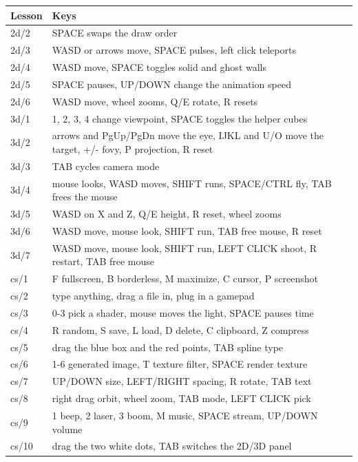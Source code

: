 \begin{center}
\begin{tabular}{@{}lp{9.6cm}@{}}
\toprule
\textbf{Lesson} & \textbf{Keys} \\
\midrule
2d/2 & SPACE swaps the draw order \\
2d/3 & WASD or arrows move, SPACE pulses, left click teleports \\
2d/4 & WASD move, SPACE toggles solid and ghost walls \\
2d/5 & SPACE pauses, UP/DOWN change the animation speed \\
2d/6 & WASD move, wheel zooms, Q/E rotate, R resets \\
3d/1 & 1, 2, 3, 4 change viewpoint, SPACE toggles the helper cubes \\
3d/2 & arrows and PgUp/PgDn move the eye, IJKL and U/O move the target, +/- fovy, P projection, R reset \\
3d/3 & TAB cycles camera mode \\
3d/4 & mouse looks, WASD moves, SHIFT runs, SPACE/CTRL fly, TAB frees the mouse \\
3d/5 & WASD on X and Z, Q/E height, R reset, wheel zooms \\
3d/6 & WASD move, mouse look, SHIFT run, TAB free mouse, R reset \\
3d/7 & WASD move, mouse look, SHIFT run, LEFT CLICK shoot, R restart, TAB free mouse \\
\midrule
cs/1 & F fullscreen, B borderless, M maximize, C cursor, P screenshot \\
cs/2 & type anything, drag a file in, plug in a gamepad \\
cs/3 & 0-3 pick a shader, mouse moves the light, SPACE pauses time \\
cs/4 & R random, S save, L load, D delete, C clipboard, Z compress \\
cs/5 & drag the blue box and the red points, TAB spline type \\
cs/6 & 1-6 generated image, T texture filter, SPACE render texture \\
cs/7 & UP/DOWN size, LEFT/RIGHT spacing, R rotate, TAB text \\
cs/8 & right drag orbit, wheel zoom, TAB mode, LEFT CLICK pick \\
cs/9 & 1 beep, 2 laser, 3 boom, M music, SPACE stream, UP/DOWN volume \\
cs/10 & drag the two white dots, TAB switches the 2D/3D panel \\
\bottomrule
\end{tabular}
\end{center}
